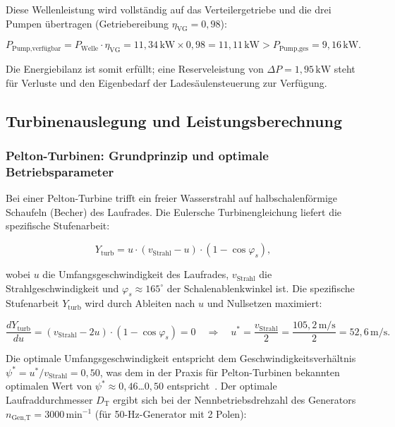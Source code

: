 ﻿\documentclass[a4paper,12pt]{article}
\begin{document}
Diese Wellenleistung wird vollständig auf das Verteilergetriebe und
die drei Pumpen übertragen (Getriebereibung $\eta_\text{VG} = 0{,}98$):

\begin{equation}
  P_\text{Pump,verfügbar}
    = P_\text{Welle} \cdot \eta_\text{VG}
    = 11{,}34\,\text{kW} \times 0{,}98
    = 11{,}11\,\text{kW}
    > P_\text{Pump,ges} = 9{,}16\,\text{kW}.
  \label{eq:P_pump_check}
\end{equation}

Die Energiebilanz ist somit erfüllt; eine Reserveleistung von
$\Delta P = 1{,}95\,\text{kW}$ steht für Verluste und den
Eigenbedarf der Ladesäulensteuerung zur Verfügung.

\subsection{Turbinenauslegung und Leistungsberechnung}

\subsubsection{Pelton-Turbinen: Grundprinzip und optimale Betriebsparameter}

Bei einer Pelton-Turbine trifft ein freier Wasserstrahl auf halbschalenförmige
Schaufeln (Becher) des Laufrades. Die Eulersche Turbinengleichung liefert die
spezifische Stufenarbeit:

\begin{equation}
  Y_\text{turb} = u \cdot (v_\text{Strahl} - u) \cdot (1 - \cos\varphi_s),
  \label{eq:euler_pelton}
\end{equation}

wobei $u$ die Umfangsgeschwindigkeit des Laufrades, $v_\text{Strahl}$ die
Strahlgeschwindigkeit und $\varphi_s \approx 165^\circ$ der Schalenablenkwinkel
ist. Die spezifische Stufenarbeit $Y_\text{turb}$ wird durch Ableiten nach $u$
und Nullsetzen maximiert:

\begin{equation}
  \frac{dY_\text{turb}}{du} = (v_\text{Strahl} - 2u) \cdot (1 - \cos\varphi_s) = 0
  \quad \Rightarrow \quad
  u^* = \frac{v_\text{Strahl}}{2} = \frac{105{,}2\,\text{m/s}}{2} = 52{,}6\,\text{m/s}.
  \label{eq:u_opt}
\end{equation}

Die optimale Umfangsgeschwindigkeit entspricht dem Geschwindigkeitsverhältnis
$\psi^* = u^*/v_\text{Strahl} = 0{,}50$, was dem in der Praxis für Pelton-Turbinen
bekannten optimalen Wert von $\psi^* \approx 0{,}46$\ldots$0{,}50$
entspricht~\cite{mollenhauer2007}. Der optimale Laufraddurchmesser $D_\text{T}$
ergibt sich bei der Nennbetriebsdrehzahl des Generators
$n_\text{Gen,T} = 3000\,\text{min}^{-1}$ (für 50-Hz-Generator mit 2 Polen):
\end{document}
